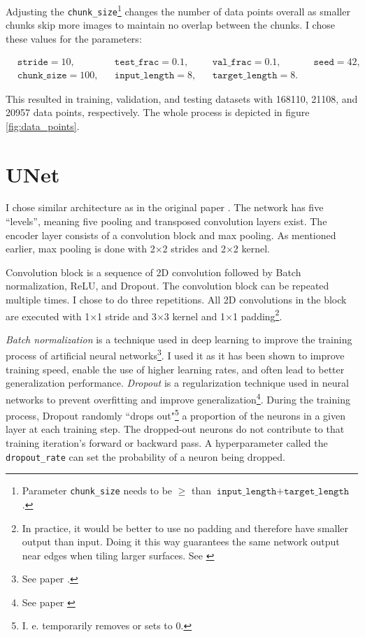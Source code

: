 Adjusting the \texttt{chunk\_size}\footnote{Parameter \texttt{chunk\_size} needs to be $\geq$ than $\texttt{input\_length} + \texttt{target\_length}$.} changes the number of data points overall as smaller chunks skip more images to maintain no overlap between the chunks. I chose these values for the parameters:

\begin{align*}
    &\texttt{stride} = 10,&  &\texttt{test\_frac} = 0.1,& &\texttt{val\_frac} = 0.1,& &\texttt{seed} = 42, \\
    &\texttt{chunk\_size} = 100,& &\texttt{input\_length} = 8,& &\texttt{target\_length} = 8.&    &
\end{align*}

\noindent This resulted in training, validation, and testing datasets with 168110, 21108, and 20957 data points, respectively. The whole process is depicted in figure \ref{fig:data_points}.

\section{UNet}
\label{sec:standard_unet}

I chose similar architecture as in the original paper \cite{unet}. The network has five ``levels'', meaning five pooling and transposed convolution layers exist. The encoder layer consists of a convolution block and max pooling. As mentioned earlier, max pooling is done with 2×2 strides and 2×2 kernel.

Convolution block is a sequence of 2D convolution followed by Batch normalization, ReLU, and Dropout. The convolution block can be repeated multiple times. I chose to do three repetitions. All 2D convolutions in the block are executed with 1×1 stride and 3×3 kernel and 1×1 padding\footnote{In practice, it would be better to use no padding and therefore have smaller output than input. Doing it this way guarantees the same network output near edges when tiling larger surfaces. See \cite[fig. 2]{unet}}.

\textit{Batch normalization} is a technique used in deep learning to improve the training process of artificial neural networks\footnote{See paper \cite{batchnorm}.}. I used it as it has been shown to improve training speed, enable the use of higher learning rates, and often lead to better generalization performance. \textit{Dropout} is a regularization technique used in neural networks to prevent overfitting and improve generalization\footnote{See paper \cite{dropout}}. During the training process, Dropout randomly ``drops out"\footnote{I. e. temporarily removes or sets to 0.} a proportion of the neurons in a given layer at each training step. The dropped-out neurons do not contribute to that training iteration's forward or backward pass. A hyperparameter called the \texttt{dropout\_rate} can set the probability of a neuron being dropped.

